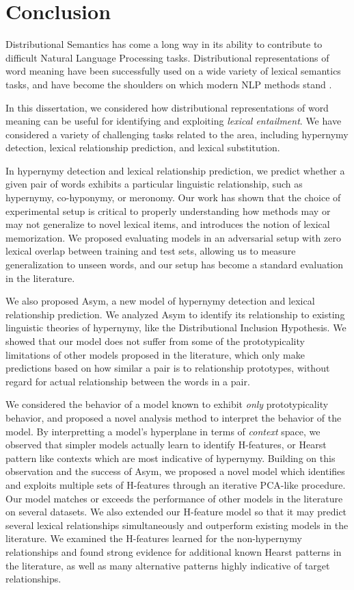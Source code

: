 \chapter{Conclusion}
\label{ch:conclusion}

Distributional Semantics has come a long way in its ability to contribute
to difficult Natural Language Processing tasks. Distributional representations
of word meaning have been successfully used on a wide variety of lexical semantics
tasks, and have become the shoulders on which modern NLP methods stand
\cite{goldberg:2016:jair}.

In this dissertation, we considered how distributional representations of word
meaning can be useful for identifying and exploiting {\em lexical entailment}.
We have considered a variety of challenging tasks related to the area,
including hypernymy detection, lexical relationship prediction, and lexical
substitution.

In hypernymy detection and lexical relationship prediction, we predict
whether a given pair of words exhibits a particular linguistic relationship,
such as hypernymy, co-hyponymy, or meronomy.
Our work has shown that the choice of experimental setup is critical to properly
understanding how methods may or may not generalize to novel lexical items,
and introduces the notion of lexical memorization. We proposed evaluating models
in an adversarial setup with zero lexical overlap between training and test
sets, allowing us to measure generalization to unseen words, and our
setup has become a standard evaluation in the literature.

We also proposed Asym, a new model of hypernymy detection and
lexical relationship prediction. We analyzed Asym to identify
its relationship to existing linguistic theories of hypernymy, like the
Distributional Inclusion Hypothesis. We showed that our model does not suffer
from some of the prototypicality limitations of other models proposed in the
literature, which only make predictions based on how similar a pair is to
relationship prototypes, without regard for actual relationship between the
words in a pair.

We considered the behavior of a model known to exhibit {\em only}
prototypicality behavior, and proposed a novel analysis method to interpret the
behavior of the model. By interpretting a model's hyperplane in terms of {\em
context} space, we observed that simpler models actually
learn to identify H-features, or Hearst pattern like contexts which are most
indicative of hypernymy. Building on this observation and the success of
Asym, we proposed a novel model which identifies and exploits multiple sets of
H-features through an iterative PCA-like procedure. Our model matches or
exceeds the performance of other models in the literature on several datasets.
We also extended our H-feature model so that it may predict several lexical
relationships simultaneously and outperform existing models in the literature.
We examined the H-features learned for the non-hypernymy relationships and
found strong evidence for additional known Hearst patterns in the literature,
as well as many alternative patterns highly indicative of target relationships.

